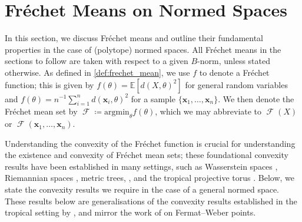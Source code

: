 \documentclass[10pt]{article}
\theoremstyle{definition}
\theoremstyle{remark}
\newcommand{\argmin}{\text{argmin}}
\DeclareMathOperator{\FMset}{\mathcal{F}}
\newcommand{\E}{\mathbb{E}}
\renewcommand{\vec}[1]{\mathbf{#1}}
\begin{document}
	\section{Fr\'echet Means on Normed Spaces} \label{sec:Normed_Space_FMs}
	
	In this section, we discuss Fr\'echet means and outline their fundamental properties in the case of (polytope) normed spaces. All Fr\'echet means in the sections to follow are taken with respect to a given $B$-norm, unless stated otherwise. As defined in \cref{def:frechet_mean}, we use $f$ to denote a Fr\'echet function; this is given by $f(\theta) = \E [d(X,\theta)^2]$ for general random variables and $f(\theta)=n^{-1} \sum_{i=1}^n d(\vec x_i,\theta)^2$ for a sample $\{ \vec x_1, \dots, \vec x_n \}$. We then denote the Fr\'echet mean set by $\FMset \coloneqq \argmin_{\theta} f(\theta)$, which we may abbreviate to $\FMset (X)$ or $\FMset(\vec x_1, \dots, \vec x_n)$.
	
	Understanding the convexity of the Fr\'echet function is crucial for understanding the existence and convexity of Fr\'echet mean sets; these foundational convexity results have been established in many settings, such as Wasserstein spaces \citep{panaretos2020frechet}, Riemannian spaces \citep{afsari2011riemannian}, metric trees, \citep{romon2023convex}, and the tropical projective torus \citep{lin2025tropical}. Below, we state the convexity results we require in the case of a general normed space. These results below are generalisations of the convexity results established in the tropical setting by \cite{lin2025tropical}, and mirror the work of \citep{durier1985geometricalFermateber} on Fermat--Weber points.
	
\end{document}

